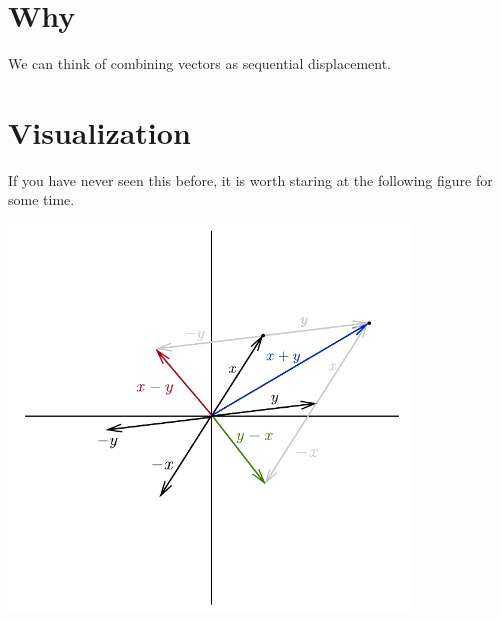 
\section*{Why}

We can think of combining vectors as sequential displacement.

\section*{Visualization}

If you have never seen this before, it is worth staring at the following figure for some time.
\begin{center}  \includegraphics[width=0.80\textwidth]{./graphics/x-y-plane-vectors.pdf}\end{center}

\blankpage